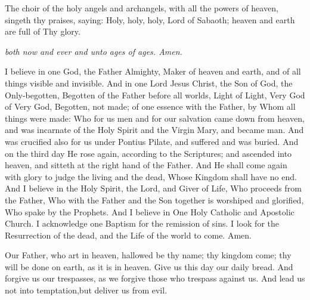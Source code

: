 \documentclass[twoside, letterpaper, 12pt]{report}
\begin{document}
The choir of the holy angels and archangels, with all the powers of heaven, singeth thy praises, saying: Holy, holy, holy, Lord of Sabaoth; heaven and earth are full of Thy glory.

\emph{both now and ever and unto ages of ages.  Amen.}



I believe in one God, the Father Almighty, Maker of heaven and earth,
and of all things visible and invisible.
And in one Lord Jesus Christ, the Son of God, the Only-begotten,
Begotten of the Father before all worlds, Light of Light, Very God of Very God,
Begotten, not made; of one essence with the Father, by Whom all things were made:
Who for us men and for our salvation came down from heaven,
and was incarnate of the Holy Spirit and the Virgin Mary, and became man.
And was crucified also for us under Pontius Pilate, and suffered and was buried.
And on the third day He rose again, according to the Scriptures; and ascended into
heaven, and sitteth at the right hand of the Father.
And He shall come again with glory to judge the living and the dead,
Whose Kingdom shall have no end.
And I believe in the Holy Spirit, the Lord, and Giver of Life,
Who proceeds from the Father,
Who with the Father and the Son together is worshiped and glorified,
Who spake by the Prophets.
And I believe in One Holy Catholic and Apostolic Church.
I acknowledge one Baptism for the remission of sins.
I look for the Resurrection of the dead, and the Life of the world to come.
Amen.





Our Father, who art in heaven, hallowed be thy name; thy kingdom come;
thy will be done on earth, as it is in heaven. Give us this day our daily bread.
And forgive us our trespasses, as we forgive those who trespass against us.
And lead us not into temptation,but deliver us from evil.

\end{document}
